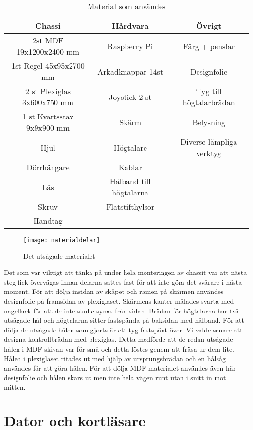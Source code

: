 \documentclass[12pt,fleqn,openany]{book} %
\begin{document}
\begin{table}[h!]
\centering
\begin{tabular}{ ||c|c|c|| } 
 \hline
 Chassi & Hårdvara & Övrigt \\ [0.5ex]
 \hline\hline
 2st MDF 19x1200x2400 mm & Raspberry Pi & Färg + penslar \\ 
 1st Regel 45x95x2700 mm & Arkadknappar 14st & Designfolie \\ 
 2 st Plexiglas 3x600x750 mm & Joystick 2 st & Tyg till högtalarbrädan \\
 1 st Kvartsstav 9x9x900 mm & Skärm & Belysning \\
 Hjul & Högtalare & Diverse lämpliga verktyg \\
 Dörrhängare & Kablar & \\
 Lås & Hålband till högtalarna & \\
 Skruv & Flatstifthylsor & \\
 Handtag & & \\
 \hline
\end{tabular}
\caption{Material som användes}
\label{table_material}
\end{table}

\begin{wrapfigure}{R}{0.35\textwidth}
  \begin{center}
    \texttt{[image: materialdelar]}
  \end{center}
  \caption{Det utsågade materialet}
  \label{fig_material}
\end{wrapfigure}
Det som var viktigt att tänka på under hela monteringen av chassit var att nästa steg fick övervägas innan delarna sattes fast 
för att inte göra det svårare i nästa moment. För att dölja insidan av skåpet och ramen på skärmen användes designfolie på 
framsidan av plexiglaset. Skärmens kanter målades svarta med nagellack för att de inte skulle synas från sidan. Brädan för 
högtalarna har två utsågade hål och högtalarna sitter fastspända på baksidan med hålband. För att dölja de utsågade hålen 
som gjorts är ett tyg fastspänt över. Vi valde senare att designa kontrollbrädan med plexiglas. Detta medförde att de redan 
utsågade hålen i MDF skivan var för små och detta löstes genom att fräsa ur dem lite. Hålen i plexiglaset ritades ut med hjälp 
av ursprungsbrädan och en hålsåg användes för att göra hålen. För att dölja MDF materialet användes även här designfolie och 
hålen skars ut men inte hela vägen runt utan i snitt in mot mitten.

\section{Dator och kortläsare}
\end{document}
